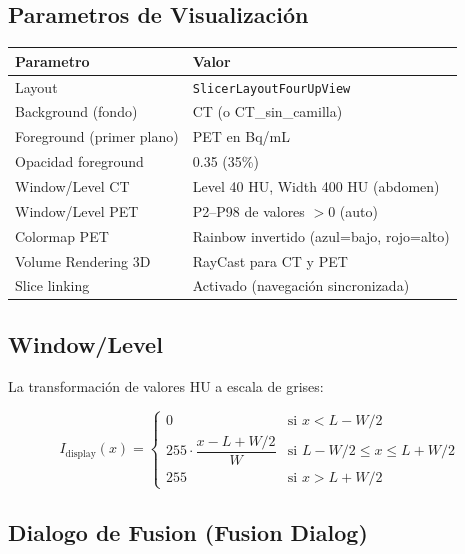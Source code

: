 \documentclass[12pt,a4paper]{article}
\begin{document}
\subsection{Parametros de Visualización}

\begin{table}[H]
\centering
\begin{tabular}{l l}
\toprule
\textbf{Parametro} & \textbf{Valor} \\
\midrule
Layout & \texttt{SlicerLayoutFourUpView} \\
Background (fondo) & CT (o CT\_sin\_camilla) \\
Foreground (primer plano) & PET en Bq/mL \\
Opacidad foreground & 0.35 (35\%) \\
Window/Level CT & Level 40 HU, Width 400 HU (abdomen) \\
Window/Level PET & P2--P98 de valores $>0$ (auto) \\
Colormap PET & Rainbow invertido (azul=bajo, rojo=alto) \\
Volume Rendering 3D & RayCast para CT y PET \\
Slice linking & Activado (navegación sincronizada) \\
\bottomrule
\end{tabular}
\end{table}

\subsection{Window/Level}

La transformación de valores HU a escala de grises:

\begin{equation}\label{eq:window_level}
    I_{\text{display}}(x) = \begin{cases}
        0 & \text{si } x < L - W/2 \\
        255 \cdot \dfrac{x - L + W/2}{W} & \text{si } L - W/2 \leq x \leq L + W/2 \\
        255 & \text{si } x > L + W/2
    \end{cases}
\end{equation}

\subsection{Dialogo de Fusion (Fusion Dialog)}
\end{document}
